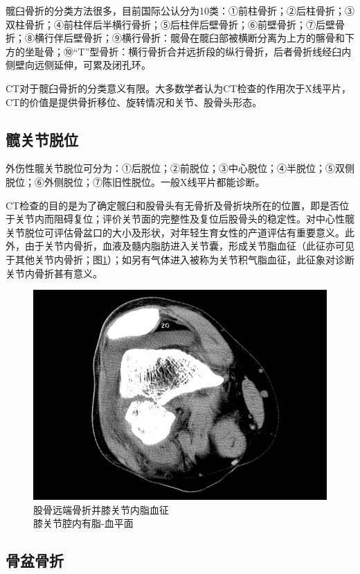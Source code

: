 髋臼骨折的分类方法很多，目前国际公认分为10类：①前柱骨折；②后柱骨折；③双柱骨折；④前柱伴后半横行骨折；⑤后柱伴后壁骨折；⑥前壁骨折；⑦后壁骨折；⑧横行伴后壁骨折；⑨横行骨折：髋骨在髋臼部被横断分离为上方的髂骨和下方的坐耻骨；⑩“T”型骨折：横行骨折合并远折段的纵行骨折，后者骨折线经臼内侧壁向远侧延伸，可累及闭孔环。

CT对于髋臼骨折的分类意义有限。大多数学者认为CT检查的作用次于X线平片，CT的价值是提供骨折移位、旋转情况和关节、股骨头形态。

\subsection{髋关节脱位}

外伤性髋关节脱位可分为：①后脱位；②前脱位；③中心脱位；④半脱位；⑤双侧脱位；⑥外侧脱位；⑦陈旧性脱位。一般X线平片都能诊断。

CT检查的目的是为了确定髋臼和股骨头有无骨折及骨折块所在的位置，即是否位于关节内而阻碍复位；评价关节面的完整性及复位后股骨头的稳定性。对中心性髋关节脱位可评估骨盆口的大小及形状，对年轻生育女性的产道评估有重要意义。此外，由于关节内骨折，血液及髓内脂肪进入关节囊，形成关节脂血征（此征亦可见于其他关节内骨折；图\ref{fig22-4}）；如另有气体进入被称为关节积气脂血征，此征象对诊断关节内骨折甚有意义。

\begin{figure}[!htbp]
 \centering
 \includegraphics[width=.7\textwidth,height=\textheight,keepaspectratio]{./images/Image00420.jpg}
 \captionsetup{justification=centering}
 \caption{股骨远端骨折并膝关节内脂血征\\{\small 膝关节腔内有脂-血平面}}
 \label{fig22-4}
  \end{figure} 

\subsection{骨盆骨折}

